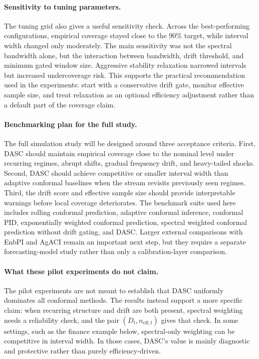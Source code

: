 \documentclass[11pt]{article}
\begin{document}
\paragraph{Sensitivity to tuning parameters.}
The tuning grid also gives a useful sensitivity check. Across the best-performing configurations, empirical coverage stayed close to the $90\%$ target, while interval width changed only moderately. The main sensitivity was not the spectral bandwidth alone, but the interaction between bandwidth, drift threshold, and minimum gated window size. Aggressive stability relaxation narrowed intervals but increased undercoverage risk. This supports the practical recommendation used in the experiments: start with a conservative drift gate, monitor effective sample size, and treat relaxation as an optional efficiency adjustment rather than a default part of the coverage claim.

\paragraph{Benchmarking plan for the full study.}
The full simulation study will be designed around three acceptance criteria. First, DASC should maintain empirical coverage close to the nominal level under recurring regimes, abrupt shifts, gradual frequency drift, and heavy-tailed shocks. Second, DASC should achieve competitive or smaller interval width than adaptive conformal baselines when the stream revisits previously seen regimes. Third, the drift score and effective sample size should provide interpretable warnings before local coverage deteriorates. The benchmark suite used here includes rolling conformal prediction, adaptive conformal inference, conformal PID, exponentially weighted conformal prediction, spectral weighted conformal prediction without drift gating, and DASC. Larger external comparisons with EnbPI and AgACI remain an important next step, but they require a separate forecasting-model study rather than only a calibration-layer comparison.

\paragraph{What these pilot experiments do not claim.}
The pilot experiments are not meant to establish that DASC uniformly dominates all conformal methods. The results instead support a more specific claim: when recurring structure and drift are both present, spectral weighting needs a reliability check, and the pair $(D_t,n_{\mathrm{eff},t})$ gives that check. In some settings, such as the finance example below, spectral-only weighting can be competitive in interval width. In those cases, DASC's value is mainly diagnostic and protective rather than purely efficiency-driven.
\end{document}
